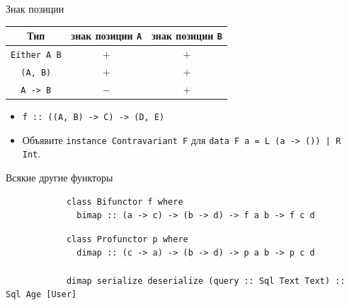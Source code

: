     \begin{frame}[fragile]{Знак позиции}
        \pause
        \begin{center}
            \begin{tabular}[h]{|c|c|c|}
                \hline
                Тип                              & знак позиции \texttt{A} & знак позиции \texttt{B} \\
                \hline
                \texttt{Either A B} & \pause $+$                                  & $+$                                  \\
                \texttt{(A, B)}     & \pause $+$                                  & $+$                                  \\
                \texttt{A -> B}     & \pause $-$                                  & $+$                                  \\
                \hline
            \end{tabular}
        \end{center}
        \vspace{1em}
        \begin{itemize}
            \item[\todo] \pause \texttt{f :: ((A, B) -> C) -> (D, E)}
            \item[\todo] \pause Объявите \texttt{instance Contravariant F} для \texttt{data F a = L (a -> ()) | R Int}.
        \end{itemize}
    \end{frame}

    \begin{frame}[fragile]{Всякие другие функторы}
        \pause
        \begin{verbatim}
            class Bifunctor f where
              bimap :: (a -> c) -> (b -> d) -> f a b -> f c d
        \end{verbatim}

        \pause\vspace{1em}
        \begin{verbatim}
            class Profunctor p where
              dimap :: (c -> a) -> (b -> d) -> p a b -> p c d

            dimap serialize deserialize (query :: Sql Text Text) :: Sql Age [User]
        \end{verbatim}
    \end{frame}

